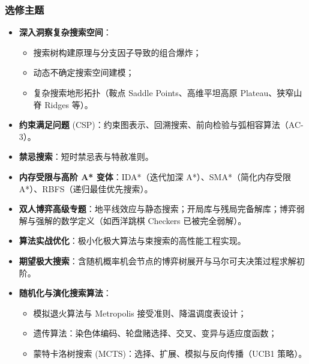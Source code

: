 \subsubsection{选修主题}
\begin{itemize}
    \item \textbf{深入洞察复杂搜索空间}：
    \begin{itemize}
        \item 搜索树构建原理与分支因子导致的组合爆炸；
        \item 动态不确定搜索空间建模；
        \item 复杂搜索地形拓扑（鞍点 Saddle Points、高维平坦高原 Plateau、狭窄山脊 Ridges 等）。
    \end{itemize}
    \item \textbf{约束满足问题} (CSP)：约束图表示、回溯搜索、前向检验与弧相容算法（AC-3）。
    \item \textbf{禁忌搜索}：短时禁忌表与特赦准则。
    \item \textbf{内存受限与高阶 A* 变体}：IDA*（迭代加深 A*）、SMA*（简化内存受限 A*）、RBFS（递归最佳优先搜索）。
    \item \textbf{双人博弈高级专题}：地平线效应与静态搜索；开局库与残局完备解库；博弈弱解与强解的数学定义（如西洋跳棋 Checkers 已被完全弱解）。
    \item \textbf{算法实战优化}：极小化极大算法与束搜索的高性能工程实现。
    \item \textbf{期望极大搜索}：含随机概率机会节点的博弈树展开与马尔可夫决策过程求解初阶。
    \item \textbf{随机化与演化搜索算法}：
    \begin{itemize}
        \item 模拟退火算法与 Metropolis 接受准则、降温调度表设计；
        \item 遗传算法：染色体编码、轮盘赌选择、交叉、变异与适应度函数；
        \item 蒙特卡洛树搜索 (MCTS)：选择、扩展、模拟与反向传播（UCB1 策略）。
    \end{itemize}
\end{itemize}

